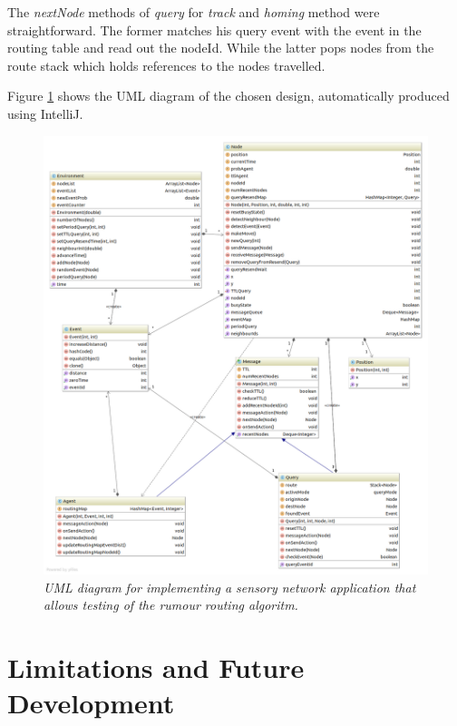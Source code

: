\documentclass[a4paper,11pt,twoside]{article}
\begin{document}
The \textit{nextNode} methods of \textit{query} for \textit{track} and
\textit{homing} method were straightforward. The former matches his
query event with the event in the routing table and read out the
nodeId. While the latter pops nodes from the route stack which holds
references to the nodes travelled. 


Figure \ref{fig:uml} shows the UML diagram of the chosen design,
automatically produced using IntelliJ.
\begin{figure}
\centering
\includegraphics[width=\textwidth]{uml.png}
\caption{\textit{UML diagram for implementing a sensory network application
  that allows testing of the rumour routing algoritm.}}
\label{fig:uml}
\end{figure}



\section{Limitations and Future Development}
\end{document}
